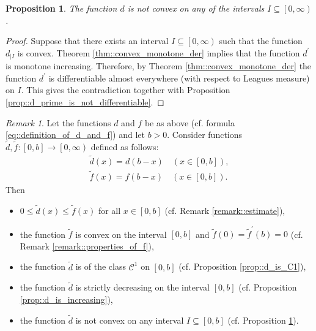 \documentclass[12pt]{article}
\renewcommand{\leq}{\leqslant}
\newcommand{\ContClass}{\mathcal{C}}
\newcommand{\paren}[1]{\! \left( #1 \right)}
\newcommand{\bracket}[1]{\! \left[ #1 \right]}
\newcommand{\displayendfileinfo}{}
\theoremstyle{plain}
\newtheorem{proposition}[theorem]{Proposition}
\theoremstyle{definition}
\theoremstyle{remark}
\newtheorem{remark}[theorem]{Remark}
\begin{document}
\begin{proposition} \label{d_is_non_convex_on_any_interval}
    The function $d$ is not convex on any of the intervals $I \subseteq \left[0, \infty \right)$.
\end{proposition}
\begin{proof}
    Suppose that there exists an interval $I \subseteq \left[0, \infty \right)$ such that the function $d_{|I}$ is convex.
    Theorem \ref{thm::convex_monotone_der} implies that the function $d^\prime$ is monotone increasing.
    Therefore, by Theorem \ref{thm::convex_monotone_der} the function $d^\prime$ is differentiable almost everywhere (with respect to Leagues measure) on $I$.
    This gives the contradiction together with Proposition \ref{prop::d_prime_is_not_differentiable}.
\end{proof}

\begin{remark}
    Let the functions $d$ and $f$ be as above (cf. formula \eqref{eq::definition_of_d_and_f}) and let $b>0$.
    Consider functions $\widetilde{d}, \widetilde{f} \colon \bracket{0, b} \to \left[0, \infty \right)$ defined as follows:
    \begin{align*}
        \widetilde{d}\paren{x} = d\paren{b-x} \quad \paren{x \in \bracket{0, b}}, \\
        \widetilde{f}\paren{x} = f\paren{b-x} \quad \paren{x \in \bracket{0, b}}.
    \end{align*}
    Then
    \begin{itemize}
        \item $0 \leq \widetilde{d}\paren{x} \leq \widetilde{f}\paren{x}$ for all $x \in \bracket{0, b}$ (cf. Remark \ref{remark::estimate}),
        \item the function $\widetilde{f}$ is convex on the interval $\bracket{0, b}$ and $\widetilde{f}\paren{0} = \widetilde{f}^\prime\paren{b} = 0$ (cf. Remark \ref{remark::properties_of_f}),
        \item the function $\widetilde{d}$ is of the class $\ContClass^1$ on $\bracket{0, b}$ (cf. Proposition \ref{prop::d_is_C1}),
        \item the function $\widetilde{d}$ is strictly decreasing on the interval $\bracket{0, b}$ (cf. Proposition \ref{prop::d_is_increasing}),
        \item the function $\widetilde{d}$ is not convex on any interval $I \subseteq \bracket{0, b}$ (cf. Proposition \ref{d_is_non_convex_on_any_interval}).
    \end{itemize} 
\end{remark}

{}


\displayendfileinfo
\end{document}
